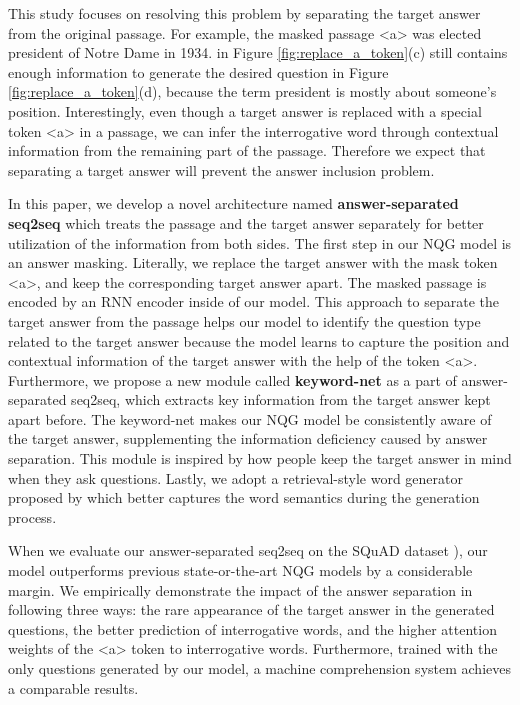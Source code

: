 \documentclass[letterpaper]{article} %
\begin{document}
This study focuses on resolving this problem by separating the target answer from the original passage. For example, the masked passage  \textless a\textgreater{} was elected president of Notre Dame in 1934. in Figure \ref{fig:replace_a_token}(c) still contains enough information to generate the desired question in Figure \ref{fig:replace_a_token}(d), because the term president is mostly about someone's position. Interestingly, even though a target answer is replaced with a special token \textless a\textgreater{} in a passage, we can infer the interrogative word through contextual information from the remaining part of the passage. Therefore we expect that separating a target answer will prevent the answer inclusion problem.

In this paper, we develop a novel architecture named \textbf{answer-separated seq2seq} which treats the passage and the target answer separately for better utilization of the information from both sides. The first step in our NQG model is an answer masking. Literally, we replace the target answer with the mask token \textless a\textgreater{}, and keep the corresponding target answer apart. The masked passage is encoded by an RNN encoder inside of our model. This approach to separate the target answer from the passage helps our model to identify the question type related to the target answer because the model learns to capture the position and contextual information of the target answer with the help of the token \textless a\textgreater{}. Furthermore, we propose a new module called \textbf{keyword-net} as a part of answer-separated seq2seq, which extracts key information from the target answer kept apart before. The keyword-net makes our NQG model be consistently aware of the target answer, supplementing the information deficiency caused by answer separation. This module is inspired by how people keep the target answer in mind when they ask questions. Lastly, we adopt a retrieval-style word generator proposed by \cite{ma2018query} which better captures the word semantics during the generation process.

When we evaluate our answer-separated seq2seq on the SQuAD dataset \cite{rajpurkar2016squad}), our model outperforms previous state-or-the-art NQG models by a considerable margin. We empirically demonstrate the impact of the answer separation in following three ways: the rare appearance of the target answer in the generated questions, the better prediction of interrogative words, and the higher attention weights of the \textless a\textgreater{} token to interrogative words. Furthermore, trained with the only questions generated by our model, a machine comprehension system achieves a comparable results.
\end{document}
